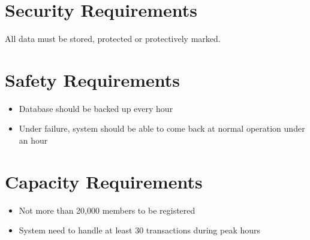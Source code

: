 \documentclass{scrreprt}
\begin{document}
\section{Security Requirements}
All data must be stored, protected or protectively marked.

\section{Safety Requirements}
\begin{itemize}
    \item Database should be backed up every hour
    \item Under failure, system should be able to come back at normal operation under an hour
\end{itemize}

\section{Capacity Requirements}
\begin{itemize}
    \item Not more than 20,000 members to be registered
    \item System need to handle at least 30 transactions during peak hours
\end{itemize}
\end{document}
